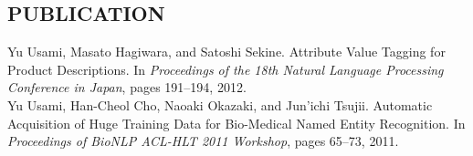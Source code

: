 \documentclass[10pt]{res}
\begin{document}
\begin{resume}
\section{\uppercase{Publication}}
Yu Usami, Masato Hagiwara, and Satoshi Sekine. Attribute Value Tagging for Product Descriptions. In \textit{Proceedings of the 18th Natural Language Processing Conference in Japan}, pages 191--194, 2012.\\
Yu Usami, Han-Cheol Cho, Naoaki Okazaki, and Jun'ichi Tsujii. Automatic Acquisition of Huge Training Data for Bio-Medical Named Entity Recognition. In \textit{Proceedings of BioNLP ACL-HLT 2011 Workshop}, pages 65--73, 2011.

\end{resume}
\end{document}
